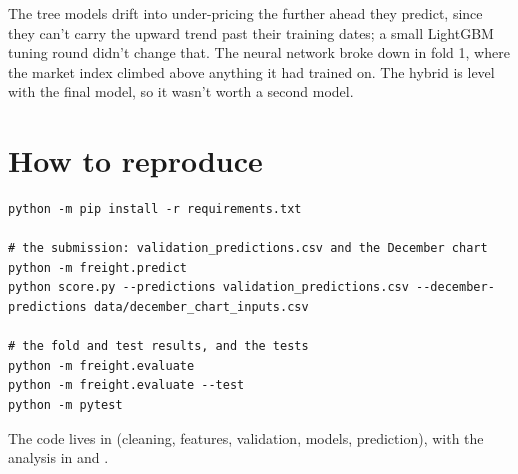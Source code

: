 \documentclass[10pt,twocolumn,letterpaper]{article}
\begin{document}
The tree models drift into under-pricing the further ahead they predict, since they can't carry the upward trend past their training dates; a small LightGBM tuning round didn't change that. The neural network broke down in fold 1, where the market index climbed above anything it had trained on. The hybrid is level with the final model, so it wasn't worth a second model.

\section{How to reproduce}\label{app:reproduce}

\begin{lstlisting}
python -m pip install -r requirements.txt

# the submission: validation_predictions.csv and the December chart
python -m freight.predict
python score.py --predictions validation_predictions.csv --december-predictions data/december_chart_inputs.csv

# the fold and test results, and the tests
python -m freight.evaluate
python -m freight.evaluate --test
python -m pytest
\end{lstlisting}

The code lives in  (cleaning, features, validation, models, prediction), with the analysis in  and .
\end{document}
